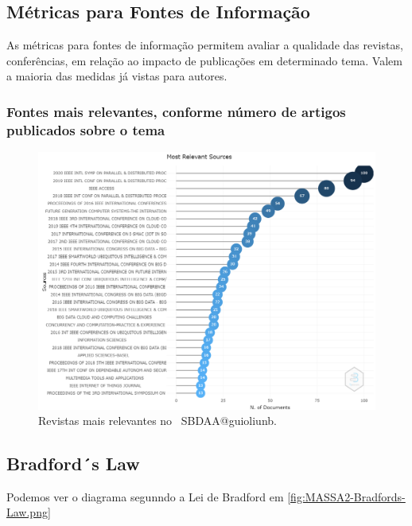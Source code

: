 \subsection{Métricas para Fontes de Informação}

As métricas para fontes de informação permitem avaliar a qualidade das revistas, conferências, em relação ao impacto de publicações em determinado tema. Valem a maioria das medidas já vistas para autores.

\subsubsection{Fontes mais relevantes, conforme número de artigos publicados sobre o tema}

\begin{figure}
    \centering
    \includegraphics[width=1\textwidth]{experiments/guioliunb/AnaliseBibliometrica/SocialBigDataAnalysis/most relevant sources.png }
    \caption{Revistas mais relevantes no  \dataset\ SBDAA@guioliunb.}
    \label{fig:MASSA2-Most-Relevant-Sources}
\end{figure}

\subsection{Bradford´s Law}

Podemos ver o diagrama segunndo a Lei de Bradford em \ref{fig:MASSA2-Bradfords-Law.png}


